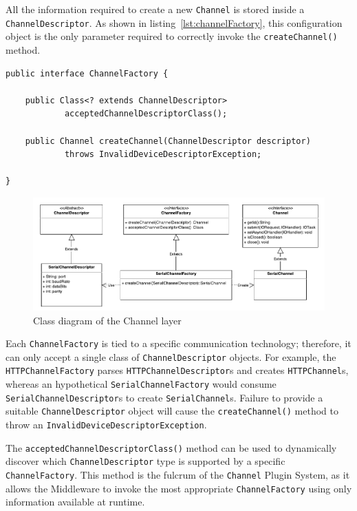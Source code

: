 All the information required to create a new \texttt{Channel} is stored inside
a \texttt{ChannelDescriptor}. As shown in listing~\ref{lst:channelFactory},
this configuration object is the only parameter required to correctly invoke
the \texttt{createChannel()} method.

\lstset{language=Java}
\begin{lstlisting}[float,caption=The ChannelFactory
interface,label={lst:channelFactory}]
public interface ChannelFactory {

	public Class<? extends ChannelDescriptor>
			acceptedChannelDescriptorClass();

	public Channel createChannel(ChannelDescriptor descriptor)
			throws InvalidDeviceDescriptorException;

}
\end{lstlisting}

\begin{figure}[h!]
\includegraphics[width=\textwidth]{imgs/channel_factory.pdf}
\caption{Class diagram of the Channel layer}
\end{figure}

Each \texttt{ChannelFactory} is tied to a specific communication technology;
therefore, it can only accept a single class of \texttt{ChannelDescriptor}
objects. For example, the \texttt{HTTPChannelFactory} parses
\texttt{HTTPChannelDescriptor}s and creates \texttt{HTTPChannel}s, whereas an
hypothetical \texttt{SerialChannelFactory} would consume
\texttt{SerialChannelDescriptor}s to create \texttt{SerialChannel}s. Failure to
provide a suitable \texttt{ChannelDescriptor} object will cause the
\texttt{createChannel()} method to throw an
\texttt{InvalidDeviceDescriptorException}.

The \texttt{acceptedChannelDescriptorClass()} method can be used to dynamically
discover which \texttt{ChannelDescriptor} type is supported by a specific
\texttt{ChannelFactory}. This method is the fulcrum of the \texttt{Channel}
Plugin System, as it allows the Middleware to invoke the most appropriate
\texttt{ChannelFactory} using only information available at runtime.

